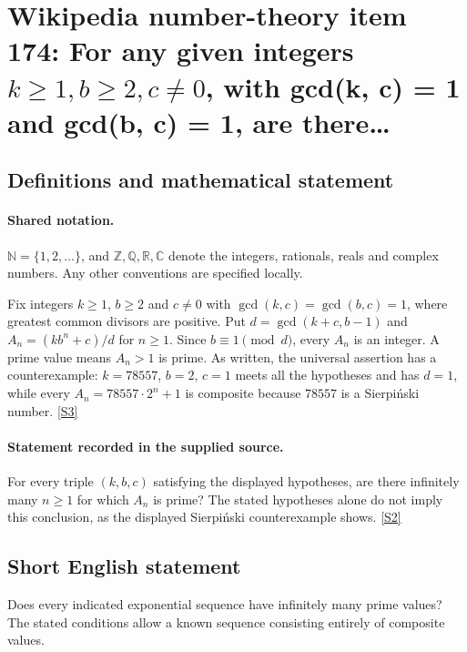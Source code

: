 \documentclass[11pt]{article}
\newcommand{\sref}[2]{\hyperlink{source:#1:#2}{[S#2]}}
\begin{document}
\section{\texorpdfstring{Wikipedia number-theory item 174: For any given integers $k\geq 1, b\geq 2, c\neq 0$, with gcd(k, c) = 1 and gcd(b, c) = 1, are there…}{Wikipedia number-theory item 174: For any given integers k>= 1, b>= 2, cneq 0, with gcd(k, c) = 1 and gcd(b, c) = 1, are there…}}\label{statement}

\subsection{Definitions and mathematical statement}

\paragraph{Shared notation.}$\mathbb N=\{1,2,\ldots\}$, and $\mathbb Z,\mathbb Q,\mathbb R,\mathbb C$ denote the integers, rationals, reals and complex numbers. Any other conventions are specified locally.


Fix integers $k\ge1$, $b\ge2$ and $c\ne0$ with $\gcd(k,c)=\gcd(b,c)=1$, where greatest common divisors are positive. Put $d=\gcd(k+c,b-1)$ and $A_n=(kb^n+c)/d$ for $n\ge1$. Since $b\equiv1\pmod d$, every $A_n$ is an integer. A prime value means $A_n>1$ is prime. As written, the universal assertion has a counterexample: $k=78557$, $b=2$, $c=1$ meets all the hypotheses and has $d=1$, while every $A_n=78557\cdot2^n+1$ is composite because $78557$ is a Sierpi\'nski number. \sref{statement}{3}
\paragraph{Statement recorded in the supplied source.}
For every triple $(k,b,c)$ satisfying the displayed hypotheses, are there infinitely many $n\ge1$ for which $A_n$ is prime? The stated hypotheses alone do not imply this conclusion, as the displayed Sierpi\'nski counterexample shows. \sref{statement}{2}
\subsection{Short English statement}
Does every indicated exponential sequence have infinitely many prime values? The stated conditions allow a known sequence consisting entirely of composite values.
\end{document}
